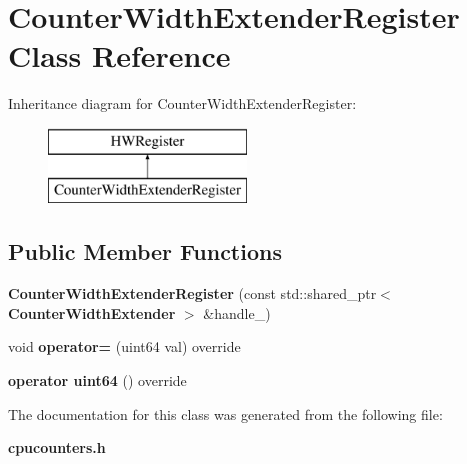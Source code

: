 \section{Counter\+Width\+Extender\+Register Class Reference}
\label{classCounterWidthExtenderRegister}
Inheritance diagram for Counter\+Width\+Extender\+Register\+:\begin{figure}[H]
\begin{center}
\leavevmode
\includegraphics[height=2.000000cm]{classCounterWidthExtenderRegister}
\end{center}
\end{figure}
\subsection*{Public Member Functions}
\begin{DoxyCompactItemize}
\item 
\mbox{\label{classCounterWidthExtenderRegister_a64728198a201f5d694c8bd5b1967a9ad}} 
{\bfseries Counter\+Width\+Extender\+Register} (const std\+::shared\+\_\+ptr$<$ \textbf{ Counter\+Width\+Extender} $>$ \&handle\+\_\+)
\item 
\mbox{\label{classCounterWidthExtenderRegister_a2495c7caf649bfc7ef1bb12a26b7a67a}} 
void {\bfseries operator=} (uint64 val) override
\item 
\mbox{\label{classCounterWidthExtenderRegister_a22b2fe3d96176c93df3a55873e9eafaf}} 
{\bfseries operator uint64} () override
\end{DoxyCompactItemize}


The documentation for this class was generated from the following file\+:\begin{DoxyCompactItemize}
\item 
\textbf{ cpucounters.\+h}\end{DoxyCompactItemize}
